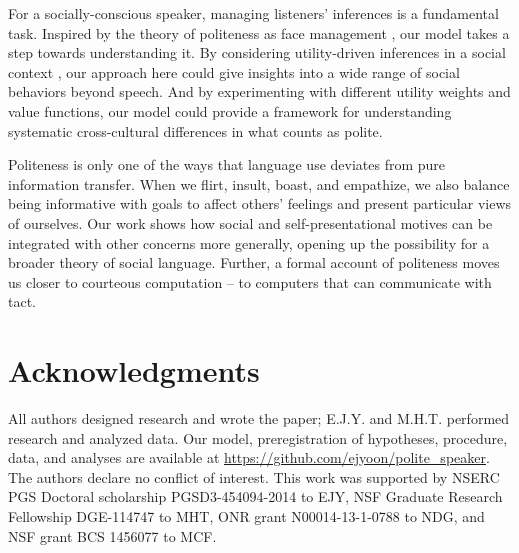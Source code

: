 \documentclass[12pt]{article}
\begin{document}
For a socially-conscious speaker, managing listeners' inferences is a fundamental task. Inspired by the theory of politeness as face management \cite{brown1987}, our model takes a step towards understanding it.
By considering utility-driven inferences in a social context \cite{baker2017rational, hamlin2013mentalistic},
our approach here could give insights into a wide range of social behaviors beyond speech. And by experimenting with different utility weights and value functions, our model could provide a framework for understanding systematic cross-cultural differences in what counts as polite.

Politeness is only one of the ways that language use deviates from pure information transfer. When we flirt, insult, boast, and empathize, we also balance being informative with goals to affect others' feelings and present particular views of ourselves. Our work shows how social and self-presentational motives can be integrated with other concerns more generally, opening up the possibility for a broader theory of social language. Further, a formal account of politeness moves us closer to courteous computation -- to computers that can communicate with tact.












\section*{Acknowledgments}
All authors designed research and wrote the paper;
E.J.Y. and M.H.T. performed research and analyzed data.
Our model,
preregistration of hypotheses, procedure, data, and analyses are available at
\url{https://github.com/ejyoon/polite_speaker}.
The authors declare no conflict of interest.
This work was supported by NSERC PGS Doctoral scholarship
PGSD3-454094-2014 to EJY, NSF Graduate Research Fellowship DGE-114747 to
MHT, ONR grant N00014-13-1-0788 to NDG, and NSF grant BCS 1456077 to
MCF.
\end{document}
